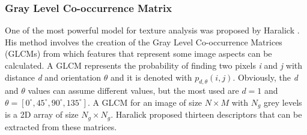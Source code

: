 \documentclass[final,a4paper,12pt,english]{UnicaPhdThesis3}
\begin{document}
\subsubsection{Gray Level Co-occurrence Matrix} \label{GLCM}
One of the most powerful model for texture analysis was proposed by Haralick \cite{Haralick}. His method involves the creation of the Gray Level Co-occurrence Matrices (\acs{GLCM}s) from which features that represent some image aspects can be calculated. A GLCM represents the probability of finding two pixels \textit{i} and \textit{j} with distance \textit{d} and orientation $\theta$ and it is denoted with $p_{d,\theta}(i,j)$. Obviously, the \textit{d} and $\theta$ values can assume different values, but the most used are $d = 1$ and $\theta = [0 ^\circ, 45 ^\circ, 90 ^\circ, 135 ^\circ]$. A GLCM for an image of size $N \times M$ with $N_{g}$ grey levels is a 2D array of size $N_{g} \times N_{g}$. Haralick proposed thirteen descriptors that can be extracted from these matrices. 
\end{document}

